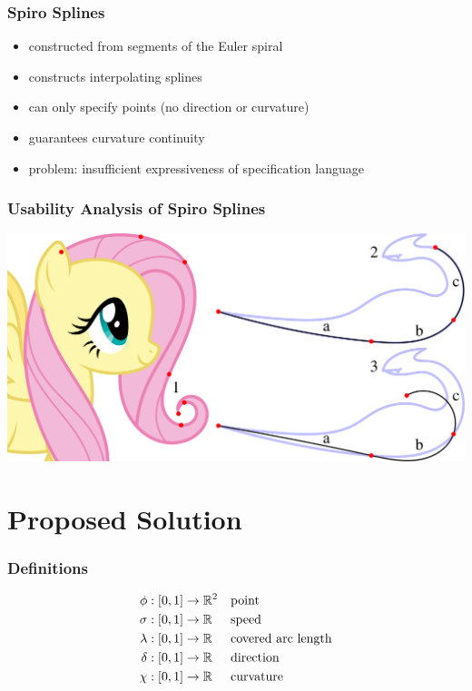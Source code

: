 \documentclass{beamer}
\begin{document}
		\begin{frame}
			\frametitle{Spiro Splines}
			\begin{itemize}
				\item constructed from segments of the Euler spiral
				\item constructs interpolating splines
				\item can only specify points (no direction or curvature)
				\item guarantees curvature continuity
				\item problem: insufficient expressiveness of specification language
			\end{itemize}
		\end{frame}
		
		\begin{frame}
			\frametitle{Usability Analysis of Spiro Splines}
			\begin{centering}
				\includegraphics[width=\textwidth]{../resources/usability_spiro.pdf}\\
			\end{centering}
		\end{frame}
	
	\section{Proposed Solution}
	
		\begin{frame}
			\frametitle{Definitions}
			\begin{align*}
				\phi    & : \left[ 0,1 \right] \rightarrow \mathbb{R}^{2} && \text{point}\\
				\sigma  & : \left[ 0,1 \right] \rightarrow \mathbb{R}   && \text{speed}\\
				\lambda & : \left[ 0,1 \right] \rightarrow \mathbb{R}   && \text{covered arc length}\\
				\delta  & : \left[ 0,1 \right] \rightarrow \mathbb{R}   && \text{direction}\\
				\chi    & : \left[ 0,1 \right] \rightarrow \mathbb{R}   && \text{curvature}
			\end{align*}
		\end{frame}
		
\end{document}
